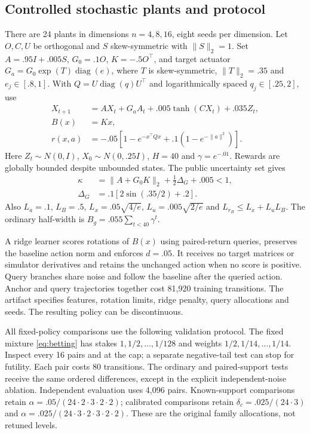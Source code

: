 \documentclass[twocolumn,nameyear]{autart}
\begin{document}
\subsection{Controlled stochastic plants and protocol}
There are 24 plants in dimensions $n=4,8,16$, eight seeds per dimension.
Let $O,C,U$ be orthogonal and $S$ skew-symmetric with $\|S\|_2=1$.
Set $A=.95I+.005S$, $G_0=.1O$, $K=-.5O^\top$, and target actuator
$G_a=G_0\exp(T)\operatorname{diag}(e)$, where $T$ is skew-symmetric,
$\|T\|_2=.35$ and $e_j\in[.8,1]$. With $Q=U\operatorname{diag}(q)U^\top$
and logarithmically spaced $q_j\in[.25,2]$, use
\begin{align}\label{eq:plant}
 X_{t+1}&=AX_t+G_aA_t+.005\tanh(CX_t)+.035Z_t,\nonumber\\
 B(x)&=Kx,\nonumber\\
 r(x,a)&=-.05[1-e^{-x^\top Qx}+.1(1-e^{-\|a\|^2})].
\end{align}
Here $Z_t\sim N(0,I)$, $X_0\sim N(0,.25I)$, $H=40$ and
$\gamma=e^{-.01}$. Rewards are globally bounded despite unbounded states.
The public uncertainty set gives
\begin{align*}
 \kappa&=\|A+G_0K\|_2+\tfrac12\Delta_G+.005<1,\\
 \Delta_G&=.1[2\sin(.35/2)+.2].
\end{align*}
Also $L_a=.1$, $L_B=.5$, $L_x=.05\sqrt{4/e}$,
$L_u=.005\sqrt{2/e}$ and $L_{r_B}\le L_x+L_uL_B$.
The ordinary half-width is $B_g=.055\sum_{t<40}\gamma^t$.



A ridge learner scores rotations of $B(x)$ using paired-return queries,
preserves the baseline action norm and enforces $d=.05$.
It receives no target matrices or simulator derivatives and retains
the unchanged action when no score is positive. Query branches share
noise and follow the baseline after the queried action. Anchor and
query trajectories together cost 81,920 training transitions.
The artifact specifies features, rotation limits, ridge penalty,
query allocations and seeds. The resulting policy can be discontinuous.

All fixed-policy comparisons use the following validation protocol.
The fixed mixture \eqref{eq:betting} has stakes
$1,1/2,\ldots,1/128$ and weights $1/2,1/14,\ldots,1/14$.
Inspect every 16 pairs and at the cap; a separate negative-tail test can
stop for futility. Each pair costs 80 transitions. The ordinary and
paired-support tests receive the same ordered differences, except in the
explicit independent-noise ablation. Independent evaluation uses 4,096
pairs. Known-support comparisons retain
$\alpha=.05/(24\cdot2\cdot3\cdot2\cdot2)$; calibrated comparisons
retain $\delta_c=.025/(24\cdot3)$ and
$\alpha=.025/(24\cdot3\cdot2\cdot3\cdot2\cdot2)$.
These are the original family allocations, not retuned levels.
\end{document}
